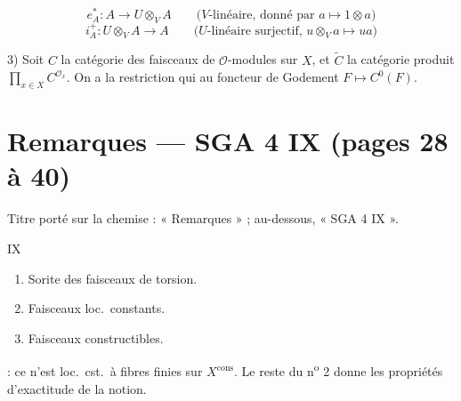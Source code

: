 \documentclass[11pt,a4paper]{article}
\begin{document}
\[
  e^{*}_{A} : A \longrightarrow U \otimes_{V} A
  \qquad \text{($V$-linéaire, donné par } a \mapsto 1 \otimes a \text{)}
\]
\[
  i^{+}_{A} : U \otimes_{V} A \longrightarrow A
  \qquad \text{($U$-linéaire surjectif, } u \otimes_{V} a \mapsto ua \text{)}
\]

3) Soit $C$ la catégorie des faisceaux de $\mathcal{O}$-modules sur $X$, et
$\widetilde{C}$ la catégorie produit $\prod_{x \in X} C^{\mathcal{O}_x}$. On a
la restriction \ill{} qui \ill{} au foncteur de Godement
$F \mapsto C^{0}(F)$.

\section*{Remarques — SGA 4 IX (pages 28 à 40)}

Titre porté sur la chemise : « Remarques » ; au-dessous, « SGA 4 IX ».

 IX
\begin{enumerate}
\item Sorite des faisceaux de torsion.
\item Faisceaux loc.\ constants.
\item Faisceaux constructibles.
\end{enumerate}

 : ce n'est \ill{} 
loc.\ cst.\ à fibres finies sur $X^{\mathrm{cons}}$. Le reste du n\textsuperscript{o} 2
donne les propriétés d'exactitude de la notion.
\end{document}
